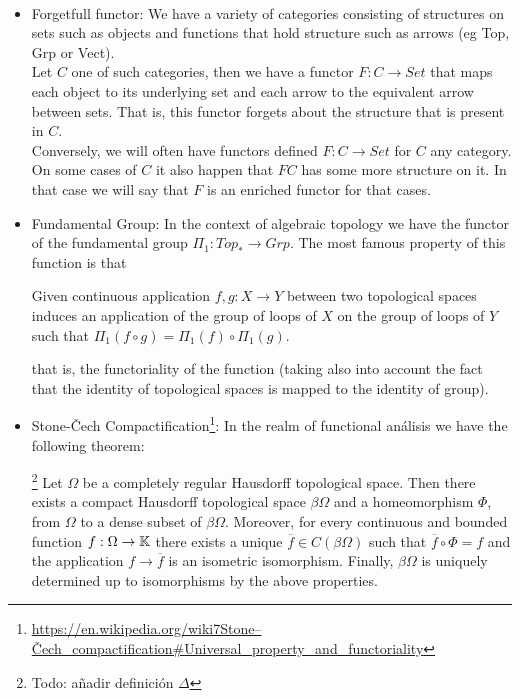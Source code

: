 \begin{example}\ 
  \begin{itemize}
  \item {Forgetfull functor}: We have a variety of categories consisting of structures on sets such as objects and functions that hold structure such as arrows (eg Top, Grp or Vect).\\
    
    Let $C$ one of such  categories, then we have a functor $F:C\to Set$ that maps each object to its underlying set and each arrow to the equivalent arrow between sets. That is, this functor forgets about the structure that is present in $C$.\\

    Conversely, we will often have functors defined $F:C\to Set$ for $C$ any category. On some cases of $C$ it also happen that $FC$ has some more structure on it. In that case we will say that $F$ is an enriched functor for that cases.

  \item Fundamental Group: In the context of algebraic topology we have the functor of the fundamental group $\Pi_1: Top_* \to Grp$. The most famous property of this function is that

    
    \begin{displayquote}
      Given continuous application $ f,g:X \to Y$ between two topological spaces induces an application of the group of loops of $X$ on the group of loops of $Y$ such that $\Pi_1(f \circ g) = \Pi_1(f) \circ \Pi_1(g)$.
    \end{displayquote}

    that is, the functoriality of the function (taking also into account the fact that the identity of topological spaces is mapped to the identity of group). 

  \item Stone-\v{C}ech Compactification\footnote{\url{https://en.wikipedia.org/wiki7Stone–Čech_compactification#Universal_property_and_functoriality}}:  In the realm of functional análisis we have the following theorem:

    \begin{theorem}\footnote{Todo: añadir definición $\Delta$} Let $\Omega$ be a completely regular Hausdorff topological space. Then there exists a compact Hausdorff topological space $\beta \Omega$ and a homeomorphism $\Phi$, from $\Omega$ to a dense subset of $\beta\Omega$. Moreover, for every continuous and bounded function $f: \Omega \to \mathbb{K}$ there exists a unique $\overline{f} \in C(\beta \Omega)$ such that $\overline{f}\circ \Phi = f$ and the application $f \to \overline{f}$ is an isometric isomorphism. Finally, $\beta \Omega$ is uniquely determined up to isomorphisms by the above properties.
    \end{theorem}


\end{itemize}
\end{example}
